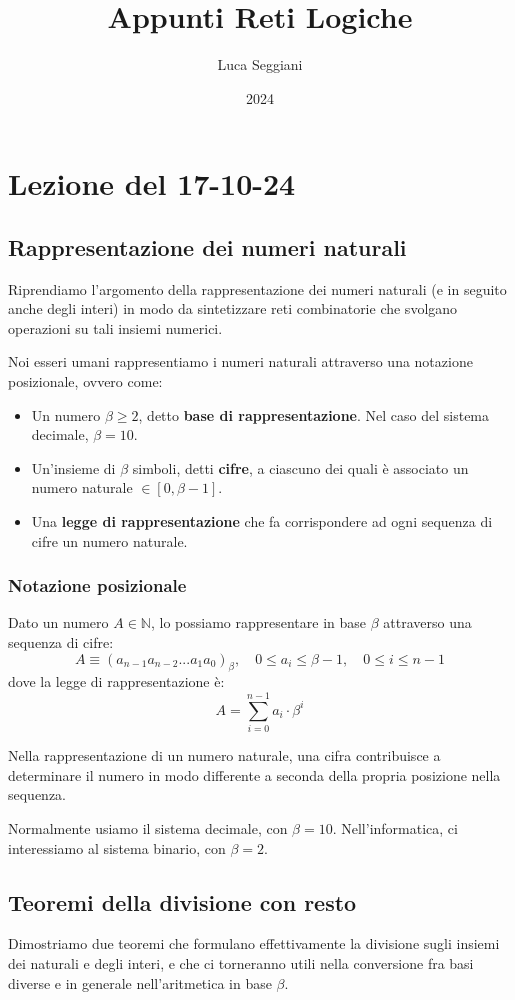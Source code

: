 \documentclass[a4paper,11pt]{article}
\title{Appunti Reti Logiche}
\author{Luca Seggiani}
\date{2024}
\begin{document}
\section{Lezione del 17-10-24}

\thispagestyle{empty}
\pagestyle{fancy}

\subsection{Rappresentazione dei numeri naturali}
Riprendiamo l'argomento della rappresentazione dei numeri naturali (e in seguito anche degli interi) in modo da sintetizzare reti combinatorie che svolgano operazioni su tali insiemi numerici.

Noi esseri umani rappresentiamo i numeri naturali attraverso una notazione posizionale, ovvero come:
\begin{itemize}
	\item Un numero $\beta \geq 2$, detto \textbf{base di rappresentazione}. Nel caso del sistema decimale, $\beta = 10$.
	\item Un'insieme di $\beta$ simboli, detti \textbf{cifre}, a ciascuno dei quali è associato un numero naturale $\in [0, \beta - 1]$.
	\item Una \textbf{legge di rappresentazione} che fa corrispondere ad ogni sequenza di cifre un numero naturale.
\end{itemize}

\subsubsection{Notazione posizionale}
Dato un numero $A \in \mathbb{N}$, lo possiamo rappresentare in base $\beta$ attraverso una sequenza di cifre:
$$ A \equiv (a_{n-1}a_{n-2} ... a_1 a_0)_\beta, \quad 0 \leq a_i \leq \beta - 1, \quad 0 \leq i \leq n - 1 $$
dove la legge di rappresentazione è:
$$
A = \sum_{i=0}^{n-1} a_i \cdot \beta^i
$$

Nella rappresentazione di un numero naturale, una cifra contribuisce a determinare il numero in modo differente a seconda della propria posizione nella sequenza.

Normalmente usiamo il sistema decimale, con $\beta = 10$. Nell'informatica, ci interessiamo al sistema binario, con $\beta = 2$.

\subsection{Teoremi della divisione con resto}
Dimostriamo due teoremi che formulano effettivamente la divisione sugli insiemi dei naturali e degli interi, e che ci torneranno utili nella conversione fra basi diverse e in generale nell'aritmetica in base $\beta$. 
\end{document}
